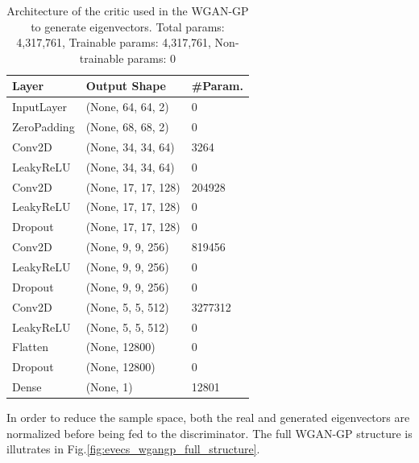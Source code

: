 \documentclass{article}
\begin{document}
\begin{table}[]
    \begin{tabular}{|l|l|l|}
    \hline
    \textbf{Layer} & \textbf{Output Shape} & \textbf{\#Param.} \\ \hline
    InputLayer     & (None, 64, 64, 2)     & 0                 \\ \hline
    ZeroPadding    & (None, 68, 68, 2)     & 0                 \\ \hline
    Conv2D         & (None, 34, 34, 64)    & 3264              \\ \hline
    LeakyReLU      & (None, 34, 34, 64)    & 0                 \\ \hline
    Conv2D         & (None, 17, 17, 128)   & 204928            \\ \hline
    LeakyReLU      & (None, 17, 17, 128)   & 0                 \\ \hline
    Dropout        & (None, 17, 17, 128)   & 0                 \\ \hline
    Conv2D         & (None, 9, 9, 256)     & 819456            \\ \hline
    LeakyReLU      & (None, 9, 9, 256)     & 0                 \\ \hline
    Dropout        & (None, 9, 9, 256)     & 0                 \\ \hline
    Conv2D         & (None, 5, 5, 512)     & 3277312           \\ \hline
    LeakyReLU      & (None, 5, 5, 512)     & 0                 \\ \hline
    Flatten        & (None, 12800)         & 0                 \\ \hline
    Dropout        & (None, 12800)         & 0                 \\ \hline
    Dense          & (None, 1)             & 12801             \\ \hline
    \end{tabular}
    \caption{Architecture of the critic used in the WGAN-GP to generate eigenvectors. Total params: 4,317,761, Trainable params: 4,317,761, Non-trainable params: 0}
    \label{tab:evecs_critic_WGANGP_architecture}
\end{table}



In order to reduce the sample space, both the real and generated eigenvectors are normalized before being fed to the discriminator. The full WGAN-GP structure is illutrates in Fig.\ref{fig:evecs_wgangp_full_structure}.
\end{document}
